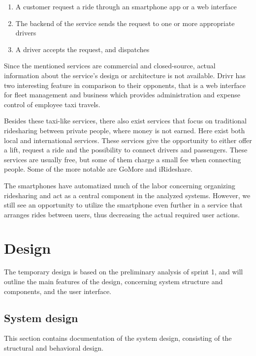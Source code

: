 \begin{enumerate}
	\item A customer request a ride through an smartphone app or a web interface
	\item The backend of the service sends the request to one or more appropriate drivers
	\item A driver accepts the request, and dispatches
\end{enumerate}

Since the mentioned services are commercial and closed-source, actual information about the service's design or architecture is not available.
Drivr has two interesting feature in comparison to their opponents, that is a web interface for fleet management and business which provides administration and expense control of employee taxi travels.

Besides these taxi-like services, there also exist services that focus on traditional ridesharing between private people, where money is not earned.
Here exist both local and international services. 
These services give the opportunity to either offer a lift, request a ride and the possibility to connect drivers and passengers.
These services are usually free, but some of them charge a small fee when connecting people.
Some of the more notable are GoMore and iRideshare.

The smartphones have automatized much of the labor concerning organizing ridesharing and act as a central component in the analyzed systems.
However, we still see an opportunity to utilize the smartphone even further in a service that arranges rides between users, thus decreasing the actual required user actions.

\section{Design}\label{sprint1design}
The temporary design is based on the preliminary analysis of sprint 1, and will outline the main features of the design, concerning system structure and components, and the user interface.

\subsection{System design}
This section contains documentation of the system design, consisting of the structural and behavioral design.

